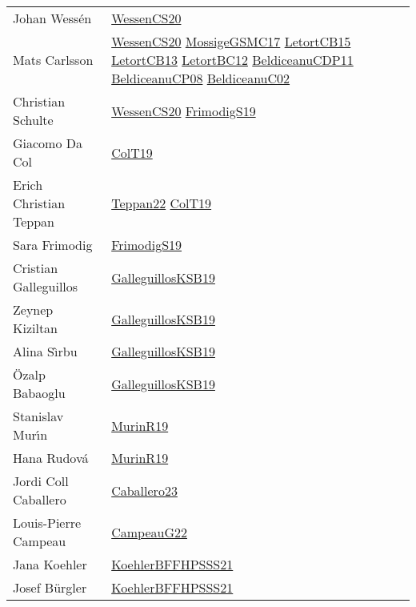 {\begin{longtable}{p{4cm}p{15cm}}
Johan Wess{\'{e}}n & \href{papers/WessenCS20.pdf}{WessenCS20}\cite{WessenCS20} \\
Mats Carlsson & \href{papers/WessenCS20.pdf}{WessenCS20}\cite{WessenCS20} \href{papers/MossigeGSMC17.pdf}{MossigeGSMC17}\cite{MossigeGSMC17} \href{articles/LetortCB15.pdf}{LetortCB15}\cite{LetortCB15} \href{papers/LetortCB13.pdf}{LetortCB13}\cite{LetortCB13} \href{papers/LetortBC12.pdf}{LetortBC12}\cite{LetortBC12} \href{articles/BeldiceanuCDP11.pdf}{BeldiceanuCDP11}\cite{BeldiceanuCDP11} \href{papers/BeldiceanuCP08.pdf}{BeldiceanuCP08}\cite{BeldiceanuCP08} \href{papers/BeldiceanuC02.pdf}{BeldiceanuC02}\cite{BeldiceanuC02} \\
Christian Schulte & \href{papers/WessenCS20.pdf}{WessenCS20}\cite{WessenCS20} \href{papers/FrimodigS19.pdf}{FrimodigS19}\cite{FrimodigS19} \\
Giacomo Da Col & \href{papers/ColT19.pdf}{ColT19}\cite{ColT19} \\
Erich Christian Teppan & \href{papers/Teppan22.pdf}{Teppan22}\cite{Teppan22} \href{papers/ColT19.pdf}{ColT19}\cite{ColT19} \\
Sara Frimodig & \href{papers/FrimodigS19.pdf}{FrimodigS19}\cite{FrimodigS19} \\
Cristian Galleguillos & \href{papers/GalleguillosKSB19.pdf}{GalleguillosKSB19}\cite{GalleguillosKSB19} \\
Zeynep Kiziltan & \href{papers/GalleguillosKSB19.pdf}{GalleguillosKSB19}\cite{GalleguillosKSB19} \\
Alina S{\^{\i}}rbu & \href{papers/GalleguillosKSB19.pdf}{GalleguillosKSB19}\cite{GalleguillosKSB19} \\
{\"{O}}zalp Babaoglu & \href{papers/GalleguillosKSB19.pdf}{GalleguillosKSB19}\cite{GalleguillosKSB19} \\
Stanislav Mur{\'{\i}}n & \href{papers/MurinR19.pdf}{MurinR19}\cite{MurinR19} \\
Hana Rudov{\'{a}} & \href{papers/MurinR19.pdf}{MurinR19}\cite{MurinR19} \\
Jordi Coll Caballero & \href{articles/Caballero23.pdf}{Caballero23}\cite{Caballero23} \\
Louis{-}Pierre Campeau & \href{articles/CampeauG22.pdf}{CampeauG22}\cite{CampeauG22} \\
Jana Koehler & \href{articles/KoehlerBFFHPSSS21.pdf}{KoehlerBFFHPSSS21}\cite{KoehlerBFFHPSSS21} \\
Josef B{\"{u}}rgler & \href{articles/KoehlerBFFHPSSS21.pdf}{KoehlerBFFHPSSS21}\cite{KoehlerBFFHPSSS21} \\

\end{longtable}}

